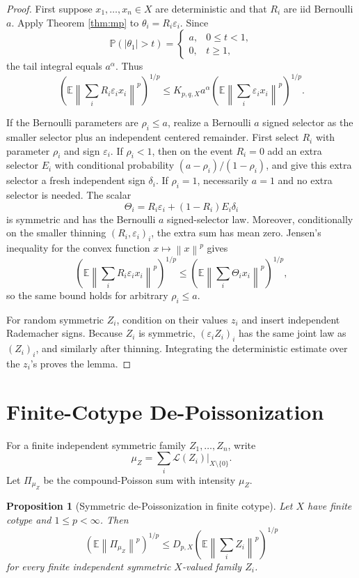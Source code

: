 \documentclass[11pt]{article}
\newtheorem{proposition}{Proposition}
\newcommand{\E}{\mathbb E}
\newcommand{\Pp}{\mathbb P}
\newcommand{\norm}[1]{\left\lVert #1\right\rVert}
\newcommand{\eps}{\varepsilon}
\newcommand{\1}{\mathbf 1}
\begin{document}
\begin{proof}
First suppose \(x_1,\ldots,x_n\in X\) are deterministic and that
\(R_i\) are iid Bernoulli \(a\).  Apply Theorem \ref{thm:mp} to
\(\theta_i=R_i\eps_i\).  Since
\[
  \Pp(|\theta_1|>t)=
  \begin{cases}
  a, &0\le t<1,\\
  0, &t\ge1,
  \end{cases}
\]
the tail integral equals \(a^\alpha\).  Thus
\[
  \left(\E\norm{\sum_i R_i\eps_i x_i}^p\right)^{1/p}
  \le
  K_{p,q,X}a^\alpha
  \left(\E\norm{\sum_i\eps_i x_i}^p\right)^{1/p}.
\]

If the Bernoulli parameters are \(\rho_i\le a\), realize a Bernoulli \(a\)
signed selector as the smaller selector plus an independent centered remainder.
First select \(R_i\) with parameter \(\rho_i\) and sign \(\eps_i\).  If
\(\rho_i<1\), then on the event \(R_i=0\) add an extra selector \(E_i\) with
conditional probability \((a-\rho_i)/(1-\rho_i)\), and give this extra selector
a fresh independent sign \(\delta_i\).  If \(\rho_i=1\), necessarily \(a=1\)
and no extra selector is needed.  The scalar
\[
  \Theta_i=R_i\eps_i+(1-R_i)E_i\delta_i
\]
is symmetric and has the Bernoulli \(a\) signed-selector law.  Moreover,
conditionally on the smaller thinning \((R_i,\eps_i)_i\), the extra sum has
mean zero.  Jensen's inequality for the convex function
\(x\mapsto\norm{x}^p\) gives
\[
  \left(\E\norm{\sum_i R_i\eps_i x_i}^p\right)^{1/p}
  \le
  \left(\E\norm{\sum_i \Theta_i x_i}^p\right)^{1/p},
\]
so the same bound holds for arbitrary \(\rho_i\le a\).

For random symmetric \(Z_i\), condition on their values \(z_i\) and insert
independent Rademacher signs.  Because \(Z_i\) is symmetric,
\((\eps_i Z_i)_i\) has the same joint law as \((Z_i)_i\), and similarly after
thinning.  Integrating the deterministic estimate over the \(z_i\)'s proves
the lemma.
\end{proof}

\section*{Finite-Cotype De-Poissonization}

For a finite independent symmetric family \(Z_1,\ldots,Z_n\), write
\[
  \mu_Z=\sum_i\mathcal L(Z_i)|_{X\setminus\{0\}}.
\]
Let \(\Pi_{\mu_Z}\) be the compound-Poisson sum with intensity \(\mu_Z\).

\begin{proposition}[Symmetric de-Poissonization in finite cotype]
\label{prop:depoisson}
Let \(X\) have finite cotype and \(1\le p<\infty\).  Then
\[
  \left(\E\norm{\Pi_{\mu_Z}}^p\right)^{1/p}
  \le
  D_{p,X}
  \left(\E\norm{\sum_i Z_i}^p\right)^{1/p}
\]
for every finite independent symmetric \(X\)-valued family \(Z_i\).
\end{proposition}
\end{document}
